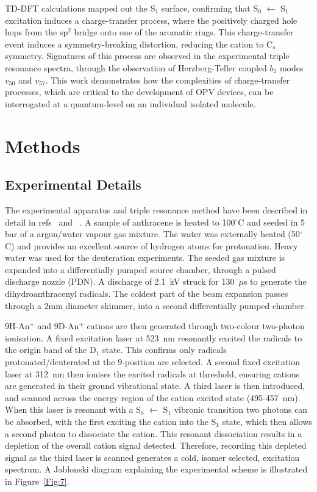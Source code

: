 \documentclass[journal=jpcafh,manuscript=article,layout=onecolumn, 12pt]{achemso}
\newcommand{\onlinecite}[1]{\hspace{-1 ex} \nocite{#1}\citenum{#1}}
\begin{document}
TD-DFT calculations mapped out the S$_1$ surface, confirming that S$_0$ $\leftarrow$ S$_1$ excitation induces a charge-transfer process, where the positively charged hole hops from the sp$^2$ bridge onto one of the aromatic rings. This charge-transfer event induces a symmetry-breaking distortion, reducing the cation to C$_s$ symmetry. Signatures of this process are observed in the experimental triple resonance spectra, through the observation of Herzberg-Teller coupled $b_2$ modes $v_{50}$ and $v_{57}$. This work demonstrates how the complexities of charge-transfer processes, which are critical to the development of OPV devices, can be interrogated at a quantum-level on an individual isolated molecule.

\section{Methods}
\subsection{Experimental Details}
The experimental apparatus and triple resonance method have been described in detail in refs~\onlinecite{kre13} and~\onlinecite{kre19}. A sample of anthracene is heated to 100$^\circ$C and seeded in 5 bar of a argon/water vapour gas mixture. The water was externally heated (50$^\circ$C) and provides an excellent source of hydrogen atoms for protonation. Heavy water was used for the deuteration experiments. The seeded gas mixture is expanded into a differentially pumped source chamber, through a pulsed discharge nozzle (PDN). A discharge of 2.1~kV struck for 130~$\mu$s to generate the dihydroanthracenyl radicals. The coldest part of the beam expansion passes through a 2mm diameter skimmer, into a second differentially pumped chamber.

9H-An$^+$ and 9D-An$^+$ cations are then generated through two-colour two-photon ionisation. A fixed excitation laser at 523~nm resonantly excited the radicals to the origin band of the D$_1$ state. This confirms only radicals protonated/deuterated at the 9-position are selected. A second fixed excitation laser at 312~nm then ionises the excited radicals at threshold, ensuring cations are generated in their ground vibrational state. A third laser is then introduced, and scanned across the energy region of the cation excited state (495-457~nm). When this laser is resonant with a S$_0$ $\leftarrow$ S$_1$ vibronic transition two photons can be absorbed, with the first exciting the cation into the S$_1$ state, which then allows a second photon to dissociate the cation. This resonant dissociation results in a depletion of the overall cation signal detected. Therefore, recording this depleted signal as the third laser is scanned generates a cold, isomer selected, excitation spectrum. A Jablonski diagram explaining the experimental scheme is illustrated in Figure~\ref{Fig:7}.
\end{document}
